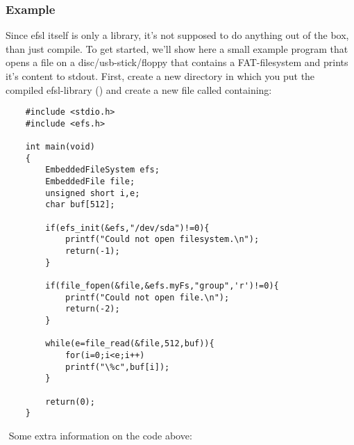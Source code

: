 \subsubsection{Example}
Since efsl itself is only a library, it's not supposed to do anything
out of the box, than just compile. To get started, we'll show here a small
example program that opens a file on a disc/usb-stick/floppy that contains
a FAT-filesystem and prints it's content to stdout.\newline
\newline
First, create a new directory in which you put the compiled efsl-library
() and create a new file called  containing:
\lstset{numbers=left, stepnumber=1, numberstyle=\small, numbersep=5pt, tabsize=4}
\begin{lstlisting}
	#include <stdio.h>
	#include <efs.h>
 
	int main(void)
	{
		EmbeddedFileSystem efs;
		EmbeddedFile file;
		unsigned short i,e;
		char buf[512];
	
		if(efs_init(&efs,"/dev/sda")!=0){
			printf("Could not open filesystem.\n");
			return(-1);
		}
	
		if(file_fopen(&file,&efs.myFs,"group",'r')!=0){
			printf("Could not open file.\n");
			return(-2);
		}

		while(e=file_read(&file,512,buf)){
			for(i=0;i<e;i++)
			printf("\%c",buf[i]);
		}
	
		return(0);
	}
\end{lstlisting}
$ $\newline
Some extra information on the code above:
